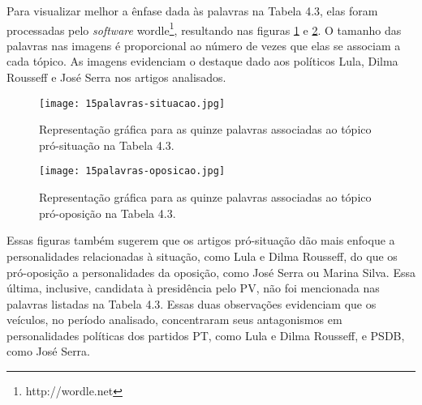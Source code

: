 Para visualizar melhor a ênfase dada às palavras na Tabela 4.3, elas foram processadas pelo \emph{software} wordle\footnote{http://wordle.net}, resultando nas figuras \ref{situacao} e \ref{oposicao}. O tamanho das palavras nas imagens é proporcional ao número de vezes que elas se associam a cada tópico. As imagens evidenciam o destaque dado aos políticos Lula, Dilma Rousseff e José Serra nos artigos analisados. %

\begin{figure}[h]
  \centering %
  \texttt{[image: 15palavras-situacao.jpg]}\\
  \caption{Representação gráfica para as quinze palavras associadas ao tópico pró-situação na Tabela 4.3.}
  \label{situacao}
\end{figure}

\begin{figure}[h]
  \centering %
  \texttt{[image: 15palavras-oposicao.jpg]}\\
  \caption{Representação gráfica para as quinze palavras associadas ao tópico pró-oposição na Tabela 4.3.}
  \label{oposicao}
\end{figure}




Essas figuras também sugerem que os artigos pró-situação dão mais enfoque a personalidades relacionadas à situação, como Lula e Dilma Rousseff, do que os pró-oposição a personalidades da oposição, como José Serra ou Marina Silva. Essa última, inclusive, candidata à presidência pelo PV, não foi mencionada nas palavras listadas na Tabela 4.3. Essas duas observações evidenciam que os veículos, no período analisado, concentraram seus antagonismos em personalidades políticas dos partidos PT, como Lula e Dilma Rousseff, e PSDB, como José Serra. 

